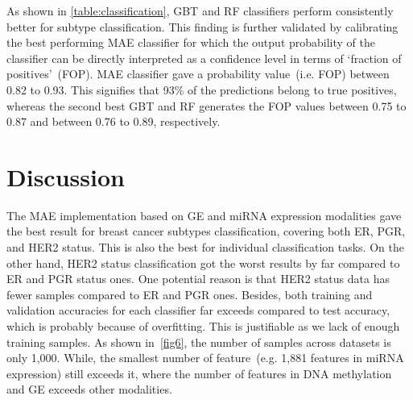 \hspace*{3.5mm} As shown in \cref{table:classification}, GBT and RF classifiers perform consistently better for subtype classification. This finding is further validated by calibrating the best performing MAE classifier for which the output probability of the classifier can be directly interpreted as a confidence level in terms of `fraction of positives'~(FOP). MAE classifier gave a probability value~(i.e. FOP) between 0.82 to 0.93. This signifies that 93\% of the predictions belong to true positives, whereas the second best GBT and RF generates the FOP values between 0.75 to 0.87 and between 0.76 to 0.89, respectively. 

\section{Discussion}\label{chapter_4:discussion}
The MAE implementation based on GE and miRNA expression modalities gave the best result for breast cancer subtypes classification, covering both ER, PGR, and HER2 status. This is also the best for individual classification tasks. On the other hand, HER2 status classification got the worst results by far compared to ER and PGR status ones. One potential reason is that HER2 status data has fewer samples compared to ER and PGR ones. Besides, both training and validation accuracies for each classifier far exceeds compared to test accuracy, which is probably because of overfitting. This is justifiable as we lack of enough  training samples. As shown in~\cref{fig6}, the number of samples across datasets is only 1,000. While, the smallest number of feature~(e.g. 1,881 features in miRNA expression) still exceeds it, where the number of features in DNA methylation and GE exceeds other modalities. 

